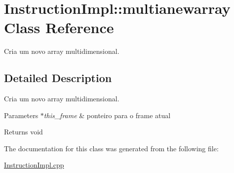 \hypertarget{class_instruction_impl_1_1multianewarray}{}\section{Instruction\+Impl\+:\+:multianewarray Class Reference}
\label{class_instruction_impl_1_1multianewarray}


Cria um novo array multidimensional.  




\subsection{Detailed Description}
Cria um novo array multidimensional. 


\begin{DoxyParams}{Parameters}
{\em $\ast$this\+\_\+frame} & ponteiro para o frame atual \\
\hline
\end{DoxyParams}
\begin{DoxyReturn}{Returns}
void 
\end{DoxyReturn}


The documentation for this class was generated from the following file\+:\begin{DoxyCompactItemize}
\item 
\hyperlink{_instruction_impl_8cpp}{Instruction\+Impl.\+cpp}\end{DoxyCompactItemize}
